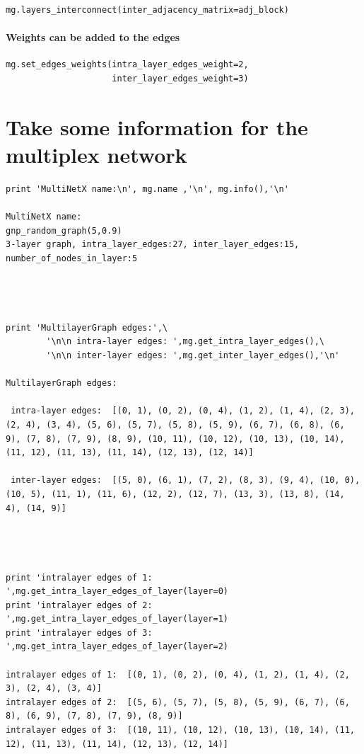 \documentclass[]{article}
\begin{document}
\begin{verbatim}
mg.layers_interconnect(inter_adjacency_matrix=adj_block)
\end{verbatim}

\paragraph{Weights can be added to the
edges}\label{weights-can-be-added-to-the-edges-1}

\begin{verbatim}
mg.set_edges_weights(intra_layer_edges_weight=2,
                     inter_layer_edges_weight=3)
\end{verbatim}

\section{Take some information for the multiplex
network}\label{take-some-information-for-the-multiplex-network}

\begin{verbatim}
print 'MultiNetX name:\n', mg.name ,'\n', mg.info(),'\n'

MultiNetX name:
gnp_random_graph(5,0.9) 
3-layer graph, intra_layer_edges:27, inter_layer_edges:15, number_of_nodes_in_layer:5  




print 'MultilayerGraph edges:',\
        '\n\n intra-layer edges: ',mg.get_intra_layer_edges(),\
        '\n\n inter-layer edges: ',mg.get_inter_layer_edges(),'\n' 

MultilayerGraph edges: 

 intra-layer edges:  [(0, 1), (0, 2), (0, 4), (1, 2), (1, 4), (2, 3), (2, 4), (3, 4), (5, 6), (5, 7), (5, 8), (5, 9), (6, 7), (6, 8), (6, 9), (7, 8), (7, 9), (8, 9), (10, 11), (10, 12), (10, 13), (10, 14), (11, 12), (11, 13), (11, 14), (12, 13), (12, 14)] 

 inter-layer edges:  [(5, 0), (6, 1), (7, 2), (8, 3), (9, 4), (10, 0), (10, 5), (11, 1), (11, 6), (12, 2), (12, 7), (13, 3), (13, 8), (14, 4), (14, 9)] 




print 'intralayer edges of 1: ',mg.get_intra_layer_edges_of_layer(layer=0)
print 'intralayer edges of 2: ',mg.get_intra_layer_edges_of_layer(layer=1)
print 'intralayer edges of 3: ',mg.get_intra_layer_edges_of_layer(layer=2)

intralayer edges of 1:  [(0, 1), (0, 2), (0, 4), (1, 2), (1, 4), (2, 3), (2, 4), (3, 4)]
intralayer edges of 2:  [(5, 6), (5, 7), (5, 8), (5, 9), (6, 7), (6, 8), (6, 9), (7, 8), (7, 9), (8, 9)]
intralayer edges of 3:  [(10, 11), (10, 12), (10, 13), (10, 14), (11, 12), (11, 13), (11, 14), (12, 13), (12, 14)]
\end{verbatim}
\end{document}
